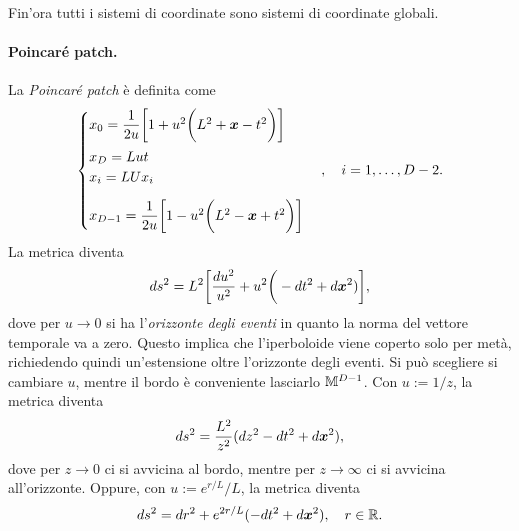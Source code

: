 Fin'ora tutti i sistemi di coordinate sono sistemi di coordinate globali.

\paragraph{Poincaré patch.} La \emph{Poincaré patch} è definita come 
\begin{equation}
    \begin{cases}
        x_0 = \dfrac{1}{2u}\bigg[1 + u^2\bigg(L^2 + \bm{x} - t^2\bigg)\bigg] \\[2ex]
        x_D = Lut \\
        x_i = LUx_i \\[2ex]
        x_{D - 1} = \dfrac{1}{2u}\bigg[1 - u^2\bigg(L^2 - \bm{x} + t^2\bigg)\bigg]
    \end{cases},\quad i = 1,\dots, D - 2.
\end{equation}
La metrica diventa 
\begin{equation}
    ds^2 = L^2\bigg[\frac{du^2}{u^2} + u^2\bigg(-dt^2 + d\bm{x}^2)\bigg],
\end{equation}
dove per $u \to 0$ si ha l'\emph{orizzonte degli eventi} in quanto la norma del vettore temporale va a zero. Questo implica che l'iperboloide viene coperto solo per metà, richiedendo quindi un'estensione oltre l'orizzonte degli eventi. Si può scegliere si cambiare $u$, mentre il bordo è conveniente lasciarlo $\mathbb{M}^{D - 1}$. Con $u := 1/z$, la metrica diventa 
\begin{equation}
    ds^2 = \frac{L^2}{z^2}(dz^2 - dt^2 + d\bm{x}^2),
\end{equation}
dove per $z \to 0$ ci si avvicina al bordo, mentre per $z \to \infty$ ci si avvicina all'orizzonte. Oppure, con $u := e^{r/L}/L$, la metrica diventa 
\begin{equation}
\label{eq: metrica AdS (u esponziale)}
    ds^2 = dr^2 + e^{2r/L}(-dt^2 + d\bm{x}^2),\quad r \in \mathbb{R}.
\end{equation}

